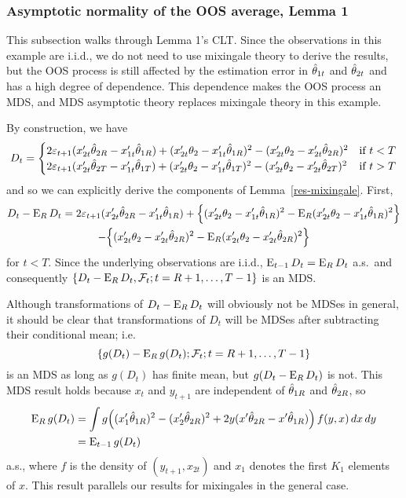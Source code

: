 \documentclass[12pt,draft]{article}
\begin{document}
\subsubsection*{Asymptotic normality of the OOS average, Lemma 1}

This subsection walks through Lemma 1's CLT. Since the observations in
this example are i.i.d., we do not need to use mixingale theory to
derive the results, but the OOS process is still affected by the
estimation error in $\hat\theta_{1t}$ and $\hat\theta_{2t}$ and has a high degree of
dependence. This dependence makes the OOS process an MDS, and MDS
asymptotic theory replaces mixingale theory in this example.

By construction, we have
\begin{equation*}
  D_t =
  \begin{cases}
    2 \varepsilon_{t+1} (x_{2t}'\hat\theta_{2R} - x_{1t}'\hat\theta_{1R})
    + (x_{2t}'\theta_2 - x_{1t}'\hat\theta_{1R})^2
    - (x_{2t}'\theta_2 - x_{2t}'\hat\theta_{2R})^2
    & \text{if } t < T \\
    2 \varepsilon_{t+1} (x_{2t}'\hat\theta_{2T} - x_{1t}'\hat\theta_{1T})
    + (x_{2t}'\theta_2 - x_{1t}'\hat\theta_{1T})^2
    - (x_{2t}'\theta_2 - x_{2t}'\hat\theta_{2T})^2
    & \text{if } t > T
  \end{cases}
\end{equation*}
and so we can explicitly derive the components of
Lemma~\ref{res-mixingale}. First,
\begin{multline*}
  D_t - \operatorname{E}_R D_t
  = 2 \varepsilon_{t+1} (x_{2t}'\hat\theta_{2R} - x_{1t}'\hat\theta_{1R})
  + \Big\{(x_{2t}'\theta_2 - x_{1t}'\hat\theta_{1R})^2
          - \operatorname{E}_R (x_{2t}'\theta_2 - x_{1t}'\hat\theta_{1R})^2 \Big\} \\
  - \Big\{(x_{2t}'\theta_2 - x_{2t}'\hat\theta_{2R})^2
          - \operatorname{E}_R (x_{2t}'\theta_2 - x_{2t}'\hat\theta_{2R})^2 \Big\}
\end{multline*}
for $t < T$. Since the underlying observations are i.i.d., $\operatorname{E}_{t-1}
D_t = \operatorname{E}_R D_t$ a.s.\ and consequently $\{D_t - \operatorname{E}_R D_t, \mathcal{F}_{t};
t=R+1,\dots,T-1\}$ is an MDS.

Although transformations of $D_t - \operatorname{E}_R D_t$ will obviously not be
MDSes in general, it should be clear that transformations of $D_t$
will be MDSes after subtracting their conditional mean; i.e.
\begin{equation*}
  \{g(D_t) - \operatorname{E}_R g(D_t); \mathcal{F}_t; t = R+1,\dots,T-1\}
\end{equation*}
is an MDS as long as
$g(D_t)$ has finite mean, but $g(D_t - \operatorname{E}_R D_t)$ is not. This MDS
result holds because $x_t$ and $y_{t+1}$ are independent of $\hat\theta_{1R}$
and $\hat\theta_{2R}$, so
\begin{equation*}\begin{split}
  \operatorname{E}_R g(D_t)
  &= \int g\Big((x_1'\hat\theta_{1R})^2 - (x_2'\hat\theta_{2R})^2
       + 2 y (x'\hat\theta_{2R} - x'\hat\theta_{1R})\Big) \, f(y, x) \, dx \, dy \\
  &= \operatorname{E}_{t-1} g(D_t)
\end{split}\end{equation*}
a.s., where $f$ is the density of $(y_{t+1}, x_{2t})$ and $x_1$
denotes the first $K_1$ elements of $x$. This result parallels our
results for mixingales in the general case.
\end{document}
